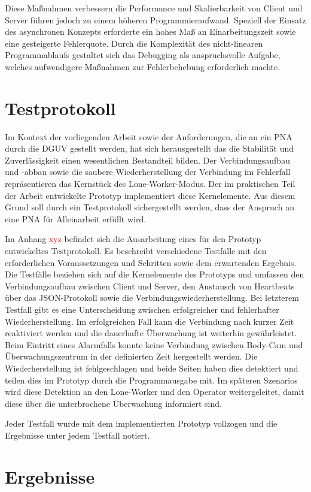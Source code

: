 \documentclass[thesis.tex]{subfiles}
\begin{document}
Diese Maßnahmen verbessern die Performance und Skalierbarkeit von Client und Server führen jedoch zu einem höheren Programmieraufwand.
Speziell der Einsatz des asynchronen Konzepts erforderte ein hohes Maß an Einarbeitungszeit sowie eine gesteigerte Fehlerquote.
Durch die Komplexität des nicht-linearen Programmablaufs gestaltet sich das Debugging als anspruchsvolle Aufgabe, welches aufwendigere Maßnahmen zur Fehlerbehebung erforderlich machte.

\section{Testprotokoll}

Im Kontext der vorliegenden Arbeit sowie der Anforderungen, die an ein PNA durch die DGUV gestellt werden, hat sich herausgestellt das die Stabilität und Zuverlässigkeit einen wesentlichen Bestandteil bilden.
Der Verbindungsaufbau und -abbau sowie die saubere Wiederherstellung der Verbindung im Fehlerfall repräsentieren das Kernstück des Lone-Worker-Modus.
Der im praktischen Teil der Arbeit entwickelte Prototyp implementiert diese Kernelemente.
Aus diesem Grund soll durch ein Testprotokoll sichergestellt werden, dass der Anspruch an eine PNA für Alleinarbeit erfüllt wird.

Im Anhang \textcolor{red}{xyz} befindet sich die Ausarbeitung eines für den Prototyp entwickeltes Testprotokoll.
Es beschreibt verschiedene Testfälle mit den erforderlichen Voraussetzungen und Schritten sowie dem erwartenden Ergebnis.
Die Testfälle beziehen sich auf die Kernelemente des Prototyps und umfassen den Verbindungsaufbau zwischen Client und Server,
den Austausch von Heartbeats über das JSON-Protokoll sowie die Verbindungswiederherstellung.
Bei letzterem Testfall gibt es eine Unterscheidung zwischen erfolgreicher und fehlerhafter Wiederherstellung.
Im erfolgreichen Fall kann die Verbindung nach kurzer Zeit reaktiviert werden und die dauerhafte Überwachung ist weiterhin gewährleistet.
Beim Eintritt eines Alarmfalls konnte keine Verbindung zwischen Body-Cam und Überwachungszentrum in der definierten Zeit hergestellt werden.
Die Wiederherstellung ist fehlgeschlagen und beide Seiten haben dies detektiert und teilen dies im Prototyp durch die Programmausgabe mit.
Im späteren Szenarios wird diese Detektion an den Lone-Worker und den Operator weitergeleitet, damit diese über die unterbrochene Überwachung informiert sind.

Jeder Testfall wurde mit dem implementierten Prototyp vollzogen und die Ergebnisse unter jedem Testfall notiert.

\section{Ergebnisse}



\subfilebib %
\end{document}
